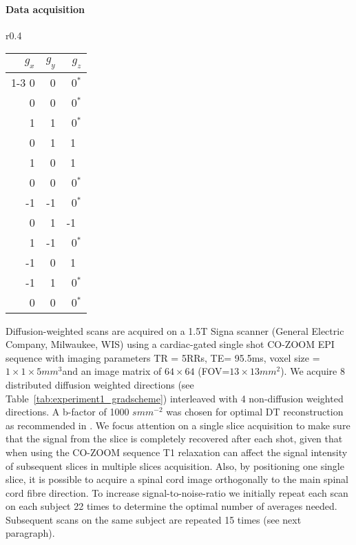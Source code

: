 \paragraph{Data acquisition} 
\begin{wraptable}{r}{0.4\textwidth}
	\centering
	\begin{tabular}{rrr}
	\toprule
	$g_x$ & $g_y$ & $g_z$\\
	\cmidrule{1-3}
	0 & 0 & 0$^*$\\
	0 & 0 & 0$^*$\\
	1 & 1 & 0$^*$\\
	0 & 1 & 1$^{\mbox{ }}$\\
	1 & 0 & 1$^{\mbox{ }}$\\
	0 & 0 & 0$^*$\\
	-1 & -1 & 0$^*$\\
	0 & 1 & -1$^{\mbox{ }}$\\
	1 & -1 & 0$^*$\\
	-1 & 0 & 1$^{\mbox{ }}$\\
	-1 & 1 & 0$^*$\\
	0 & 0 & 0$^*$\\
	\bottomrule
	\end{tabular}
	\label{tab:experiment1_gradscheme}
\end{wraptable}
Diffusion-weighted scans are acquired on a 1.5T Signa scanner (General Electric Company, Milwaukee, WIS) using a cardiac-gated single shot CO-ZOOM EPI sequence \citep{Dowell:2009} with imaging parameters TR = 5RRs, TE= 95.5ms, voxel size = $1\times 1 \times 5mm^3$and an image matrix of $64\times 64$ (FOV=$13\times 13mm^2$). We acquire 8 distributed diffusion weighted directions (see Table~\ref{tab:experiment1_gradscheme}) interleaved with 4 non-diffusion weighted directions. A b-factor of 1000 $smm^{-2}$ was chosen for optimal DT reconstruction as recommended in \citet{Jones:2004a}. We focus attention on a single slice acquisition to make sure that the signal from the slice is completely recovered after each shot, given that when using the CO-ZOOM sequence T1 relaxation can affect the signal intensity of subsequent slices in multiple slices acquisition. Also, by positioning one single slice, it is possible to acquire a spinal cord image orthogonally to the main spinal cord fibre direction. To increase signal-to-noise-ratio we initially repeat each scan on each subject 22 times to determine the optimal number of averages needed. Subsequent scans on the same subject are repeated 15 times (see next paragraph). 

